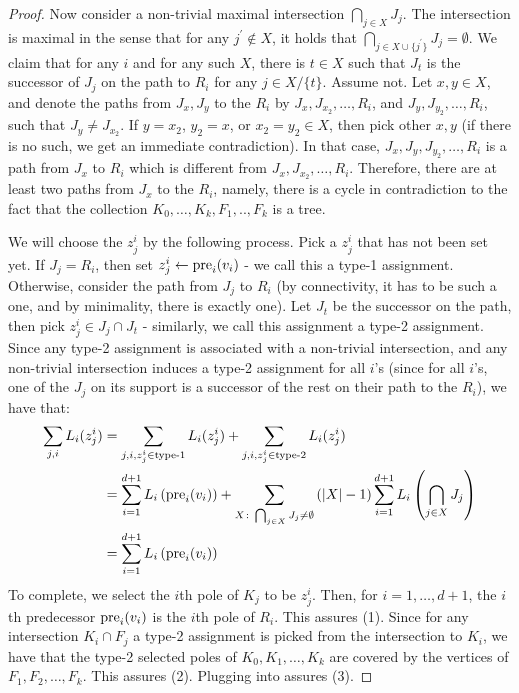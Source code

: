 \begin{proof}
    
    Now consider a non-trivial maximal intersection $\bigcap_{j \in X} J_{j}$. The intersection is maximal in the sense that for any $j^{\prime} \notin X$, it holds that $\bigcap_{j \in X\cup \{j^{\prime} \}} J_{j} = \emptyset$. We claim that for any $i$ and for any such $X$, there is $t \in X$ such that $J_{t}$ is the successor of $J_{j}$ on the path to $R_{i}$ for any $j \in X/\{t\}$. Assume not. Let $x, y \in X$, and denote the paths from $J_{x}, J_{y}$ to the $R_{i}$ by $J_{x}, J_{x_2}, \ldots, R_{i}$, and $J_{y}, J_{y_2}, \ldots, R_{i}$, such that $J_{y} \neq J_{x_{2}}$. If $y = x_{2}$, $y_{2} = x$, or $x_{2} = y_{2} \in X$, then pick other $x, y$ (if there is no such, we get an immediate contradiction). In that case, $J_{x}, J_{y}, J_{y_{2}}, \ldots, R_{i}$ is a path from $J_{x}$ to $R_{i}$ which is different from $J_{x}, J_{x_{2}}, \ldots, R_{i}$. Therefore, there are at least two paths from $J_{x}$ to the $R_{i}$, namely, there is a cycle in contradiction to the fact that the collection $K_{0}, \ldots, K_{k}, F_{1},..,F_{k}$ is a tree.


    We will choose the $z_{j}^{i}$ by the following process. Pick a $z_{j}^{i}$ that has not been set yet. If $J_{j} = R_{i}$, then set $z_{j}^{i} \leftarrow \text{pre}_{i}(v_{i})$ - we call this a type-1 assignment. Otherwise, consider the path from $J_{j}$ to $R_{i}$ (by connectivity, it has to be such a one, and by minimality, there is exactly one). Let $J_{t}$ be the successor on the path, then pick $z_{j}^{i} \in J_{j} \cap J_{t}$ - similarly, we call this assignment a type-2 assignment. Since any type-2 assignment is associated with a non-trivial intersection, and any non-trivial intersection induces a type-2 assignment for all $i$'s (since for all $i$'s, one of the $J_{j}$ on its support is a successor of the rest on their path to the $R_{i}$), we have that:
    \begin{equation}
      \label{equ:span}
      \begin{split}
        \sum_{j,i}L_{i}(z_{j}^{i}) &= \sum_{j,i, z_{j}^{i} \in \text{type-1}}L_{i}(z_{j}^{i}) + \sum_{j,i, z_{j}^{i} \in \text{type-2}}L_{i}(z_{j}^{i}) \\
        &= \sum_{i=1}^{d+1}L_{i}\left( \text{pre}_{i}(v_{i}) \right) + \sum_{X \colon \bigcap_{j\in X}J_{j} \neq \emptyset }\left(|X|-1\right) \sum_{i=1}^{d+1} L_{i}\left(\bigcap_{j\in X}J_{j} \right) \\ 
        &=\sum_{i=1}^{d+1}L_{i}\left( \text{pre}_{i}(v_{i}) \right) 
      \end{split}
    \end{equation}
To complete, we select the $i$th pole of $K_{j}$ to be $z^{i}_{j}$. Then, for $i=1,\ldots,d+1$, the $i$th predecessor $\text{pre}_{i}(v_{i})$ is the $i$th pole of $R_{i}$. This assures (1). Since for any intersection $K_{i}\cap F_{j}$ a type-2 assignment is picked from the intersection to $K_{i}$, we have that the type-2 selected poles of $K_{0},K_{1},\ldots,K_{k}$ are covered by the vertices of $F_{1},F_{2},\ldots,F_{k}$. This assures (2). Plugging  into  assures (3).
  \end{proof}

